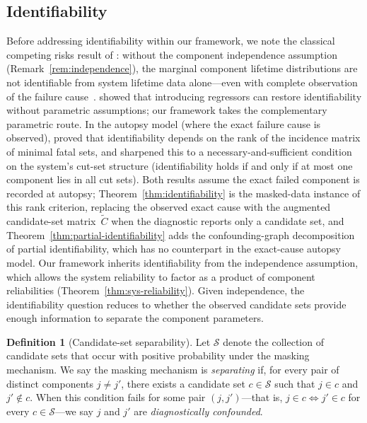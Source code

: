 \documentclass[11pt]{article}
\theoremstyle{definition}
\newtheorem{definition}{Definition}
\theoremstyle{plain}
\begin{document}
\subsection{Identifiability}
\label{sec:identifiability}

Before addressing identifiability within our framework, we note the
classical competing risks result of \citet{tsiatis1975}: without the
component independence assumption (Remark~\ref{rem:independence}),
the marginal component lifetime distributions are not identifiable from
system lifetime data alone---even with complete observation of the
failure cause~\citep[see also][for textbook treatments]{crowder2001}.
\citet{heckman1989} showed that introducing regressors can restore
identifiability without parametric assumptions; our framework takes the
complementary parametric route.
In the autopsy model (where the exact failure cause is observed),
\citet{meilijson1981} proved that identifiability depends on the rank of
the incidence matrix of minimal fatal sets, and \citet{nowik1990}
sharpened this to a necessary-and-sufficient condition on the
system's cut-set structure (identifiability holds if and only if at
most one component lies in all cut sets).
Both results assume the exact failed component is recorded at autopsy;
Theorem~\ref{thm:identifiability} is the masked-data instance of this
rank criterion, replacing the observed exact cause with the augmented
candidate-set matrix~$\tilde{C}$ when the diagnostic reports only a
candidate set, and Theorem~\ref{thm:partial-identifiability} adds the
confounding-graph decomposition of partial identifiability, which has
no counterpart in the exact-cause autopsy model.
Our framework inherits identifiability from the independence assumption,
which allows the system reliability to factor as a product of component
reliabilities (Theorem~\ref{thm:sys-reliability}).
Given independence, the identifiability question reduces to whether the
observed candidate sets provide enough information to separate the
component parameters.

\begin{definition}[Candidate-set separability]
\label{def:separability}
Let $\mathcal{S}$ denote the collection of candidate sets that occur
with positive probability under the masking mechanism.
We say the masking mechanism is \emph{separating} if, for every pair
of distinct components $j \neq j'$, there exists a candidate set
$c \in \mathcal{S}$ such that $j \in c$ and $j' \notin c$.
When this condition fails for some pair $(j, j')$---that is,
$j \in c \iff j' \in c$ for every $c \in \mathcal{S}$---we say $j$
and $j'$ are \emph{diagnostically confounded}.
\end{definition}
\end{document}
